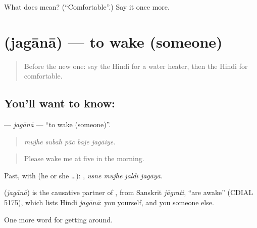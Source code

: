 \begin{tcolorbox}[breakable,colback=teal!4,colframe=teal!35!black,title={Before you move on}]
What does  mean? (\textquotedblleft{}Comfortable\textquotedblright{}.) Say it once more.
\end{tcolorbox}
\section[\texorpdfstring{\hi{जगाना} (jagānā)}{जगाना (jagānā)}]{ (jagānā) — to wake (someone)}

\label{lesson:HI-C414-jagana}



\begin{quote}
Before the new one: say the Hindi for a water heater, then the Hindi for comfortable.
\end{quote}

\subsection*{You'll want to know: }
\textbf{} — \emph{jagānā} — \textquotedblleft{}to wake (someone)\textquotedblright{}.

\begin{quote}
    
\end{quote}

\begin{quote}
\emph{mujhe subah pā̃c baje jagāiye.}
\end{quote}

\begin{quote}
Please wake me at five in the morning.
\end{quote}

Past, with  (he or she …):    , \emph{usne mujhe jaldī jagāyā}.

\begin{cousinweb}
\textbf{} (\emph{jagānā}) is the causative partner of , from Sanskrit \emph{jāgrati}, \textquotedblleft{}are awake\textquotedblright{} (CDIAL 5175), which lists Hindi \emph{jagānā}: you  yourself, and you  someone else.
\end{cousinweb}

\begin{grammarlens}[title={What you've built}]
One more word for getting around.
\end{grammarlens}

